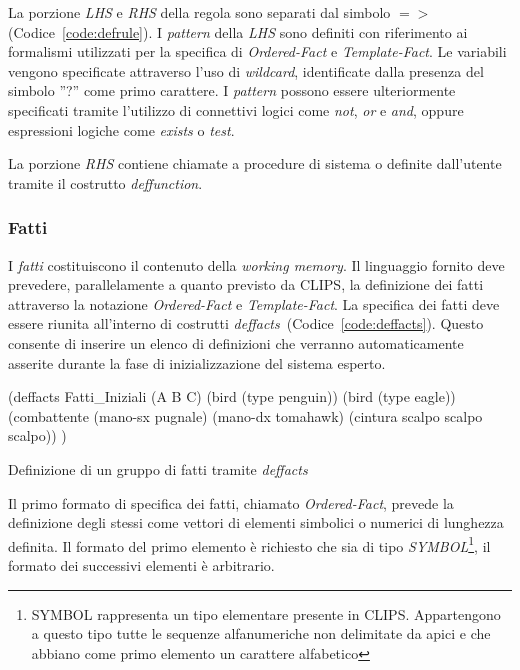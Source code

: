 La porzione \emph{LHS} e \emph{RHS} della regola sono separati dal simbolo $=>$ (Codice~\ref{code:defrule}). I \emph{pattern} della \emph{LHS} sono definiti con riferimento ai formalismi utilizzati per la specifica di \emph{Ordered-Fact} e \emph{Template-Fact}. Le variabili vengono specificate attraverso l'uso di \emph{wildcard}, identificate dalla presenza del simbolo ''?'' come primo carattere. I \emph{pattern} possono essere ulteriormente specificati tramite l'utilizzo di connettivi logici come \emph{not}, \emph{or} e \emph{and}, oppure espressioni logiche come \emph{exists} o \emph{test}.

La porzione \emph{RHS} contiene chiamate a procedure di sistema o definite dall'utente tramite il costrutto \emph{deffunction}.


\subsubsection{Fatti}\label{par:linguaggio-fatti}
I \emph{fatti} costituiscono il contenuto della \emph{working memory}. Il linguaggio fornito deve prevedere, parallelamente a quanto previsto da CLIPS, la definizione dei fatti attraverso la notazione \emph{Ordered-Fact} e \emph{Template-Fact}. La specifica dei fatti deve essere riunita all'interno di costrutti \emph{deffacts}~(Codice~\ref{code:deffacts}). Questo consente di inserire un elenco di definizioni che verranno automaticamente asserite durante la fase di inizializzazione del sistema esperto.

\begin{program}
\begin{verbatimtab}

(deffacts Fatti_Iniziali
	(A B C)
	(bird (type penguin))
	(bird (type eagle))
	(combattente
		(mano-sx pugnale)
		(mano-dx tomahawk)
		(cintura scalpo scalpo scalpo))
)
\end{verbatimtab}
\caption{Definizione di un gruppo di fatti tramite \emph{deffacts}}\label{code:deffacts}
\end{program}

Il primo formato di specifica dei fatti, chiamato \emph{Ordered-Fact}, prevede la definizione degli stessi come vettori di elementi simbolici o numerici di lunghezza definita. Il formato del primo elemento è richiesto che sia di tipo \emph{SYMBOL}\footnote{SYMBOL rappresenta un tipo elementare presente in CLIPS. Appartengono a questo tipo tutte le sequenze alfanumeriche non delimitate da apici e che abbiano come primo elemento un carattere alfabetico}, il formato dei successivi elementi è arbitrario.

